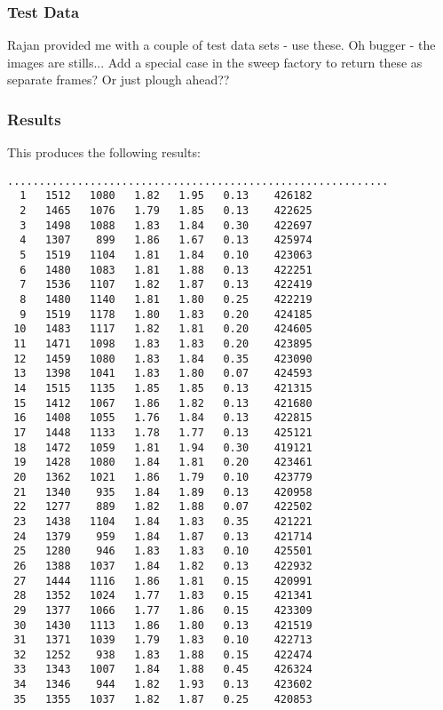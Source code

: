\documentclass[a4paper, 11pt]{article}
\begin{document}
\subsubsection{Test Data}

Rajan provided me with a couple of test data sets - use these. Oh bugger - the 
images are stills... Add a special case in the sweep factory to return these 
as separate frames? Or just plough ahead??

\subsubsection{Results}

This produces the following results:

{
\small
\begin{verbatim}
............................................................
  1   1512   1080   1.82   1.95   0.13    426182
  2   1465   1076   1.79   1.85   0.13    422625
  3   1498   1088   1.83   1.84   0.30    422697
  4   1307    899   1.86   1.67   0.13    425974
  5   1519   1104   1.81   1.84   0.10    423063
  6   1480   1083   1.81   1.88   0.13    422251
  7   1536   1107   1.82   1.87   0.13    422419
  8   1480   1140   1.81   1.80   0.25    422219
  9   1519   1178   1.80   1.83   0.20    424185
 10   1483   1117   1.82   1.81   0.20    424605
 11   1471   1098   1.83   1.83   0.20    423895
 12   1459   1080   1.83   1.84   0.35    423090
 13   1398   1041   1.83   1.80   0.07    424593
 14   1515   1135   1.85   1.85   0.13    421315
 15   1412   1067   1.86   1.82   0.13    421680
 16   1408   1055   1.76   1.84   0.13    422815
 17   1448   1133   1.78   1.77   0.13    425121
 18   1472   1059   1.81   1.94   0.30    419121
 19   1428   1080   1.84   1.81   0.20    423461
 20   1362   1021   1.86   1.79   0.10    423779
 21   1340    935   1.84   1.89   0.13    420958
 22   1277    889   1.82   1.88   0.07    422502
 23   1438   1104   1.84   1.83   0.35    421221
 24   1379    959   1.84   1.87   0.13    421714
 25   1280    946   1.83   1.83   0.10    425501
 26   1388   1037   1.84   1.82   0.13    422932
 27   1444   1116   1.86   1.81   0.15    420991
 28   1352   1024   1.77   1.83   0.15    421341
 29   1377   1066   1.77   1.86   0.15    423309
 30   1430   1113   1.86   1.80   0.13    421519
 31   1371   1039   1.79   1.83   0.10    422713
 32   1252    938   1.83   1.88   0.15    422474
 33   1343   1007   1.84   1.88   0.45    426324
 34   1346    944   1.82   1.93   0.13    423602
 35   1355   1037   1.82   1.87   0.25    420853

\end{verbatim}}
\end{document}
